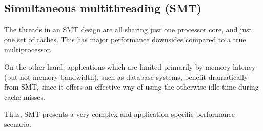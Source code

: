 \subsection{Simultaneous multithreading (SMT)}

The threads in an SMT design are all sharing just one processor core, and just one set of caches. This has major performance downsides compared to a true multiprocessor.

On the other hand, applications which are limited primarily by memory latency (but not memory bandwidth), such as database systems, benefit dramatically from SMT, since it offers an effective way of using the otherwise idle time during cache misses.

Thus, SMT presents a very complex and application-specific performance scenario.
